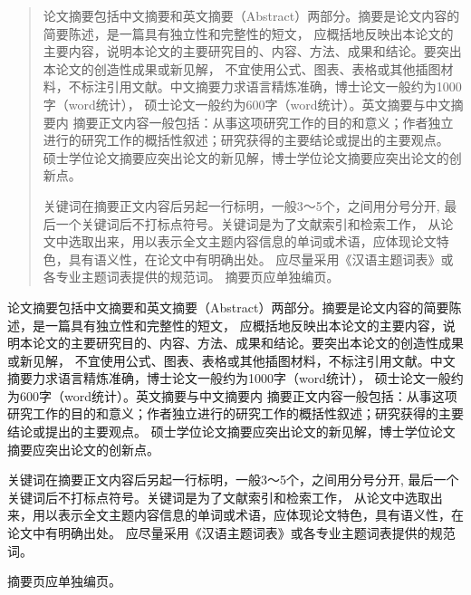 

\begin{abstract}
  论文摘要包括中文摘要和英文摘要（Abstract）两部分。摘要是论文内容的简要陈述，是一篇具有独立性和完整性的短文，
  应概括地反映出本论文的主要内容，说明本论文的主要研究目的、内容、方法、成果和结论。要突出本论文的创造性成果或新见解，
  不宜使用公式、图表、表格或其他插图材料，不标注引用文献。中文摘要力求语言精炼准确，博士论文一般约为1000字（word统计），
  硕士论文一般约为600字（word统计）。英文摘要与中文摘要内
  摘要正文内容一般包括：从事这项研究工作的目的和意义；作者独立进行的研究工作的概括性叙述；研究获得的主要结论或提出的主要观点。
  硕士学位论文摘要应突出论文的新见解，博士学位论文摘要应突出论文的创新点。
  
  关键词在摘要正文内容后另起一行标明，一般3～5个，之间用分号分开, 最后一个关键词后不打标点符号。关键词是为了文献索引和检索工作，
  从论文中选取出来，用以表示全文主题内容信息的单词或术语，应体现论文特色，具有语义性，在论文中有明确出处。
  应尽量采用《汉语主题词表》或各专业主题词表提供的规范词。
  摘要页应单独编页。
\end{abstract}

\begin{abstract*}
  论文摘要包括中文摘要和英文摘要（Abstract）两部分。摘要是论文内容的简要陈述，是一篇具有独立性和完整性的短文，
  应概括地反映出本论文的主要内容，说明本论文的主要研究目的、内容、方法、成果和结论。要突出本论文的创造性成果或新见解，
  不宜使用公式、图表、表格或其他插图材料，不标注引用文献。中文摘要力求语言精炼准确，博士论文一般约为1000字（word统计），
  硕士论文一般约为600字（word统计）。英文摘要与中文摘要内
  摘要正文内容一般包括：从事这项研究工作的目的和意义；作者独立进行的研究工作的概括性叙述；研究获得的主要结论或提出的主要观点。
  硕士学位论文摘要应突出论文的新见解，博士学位论文摘要应突出论文的创新点。
  
  关键词在摘要正文内容后另起一行标明，一般3～5个，之间用分号分开, 最后一个关键词后不打标点符号。关键词是为了文献索引和检索工作，
  从论文中选取出来，用以表示全文主题内容信息的单词或术语，应体现论文特色，具有语义性，在论文中有明确出处。
  应尽量采用《汉语主题词表》或各专业主题词表提供的规范词。

  摘要页应单独编页。
\end{abstract*}
